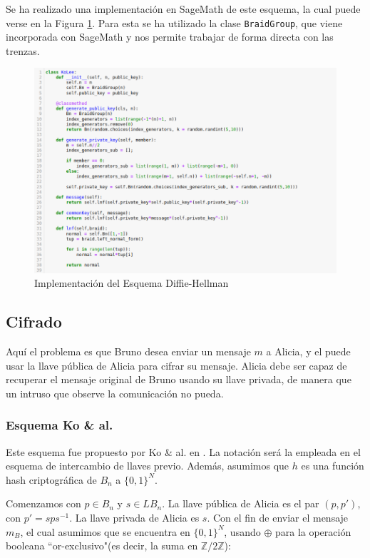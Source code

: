\documentclass[12pt]{book}
\theoremstyle{definition}
\begin{document}
Se ha realizado una implementación en SageMath de este esquema, la cual puede verse en la Figura \ref{img:imp_ko}. Para esta se ha utilizado la clase \texttt{BraidGroup}, que viene incorporada con SageMath y nos permite trabajar de forma directa con las trenzas.
\begin{figure}
\includegraphics[scale=0.5]{imgs/KoLee.png}
\caption{Implementación del Esquema Diffie-Hellman}
\label{img:imp_ko}
\end{figure}

\subsection{Cifrado}
Aquí el problema es que Bruno desea enviar un mensaje $m$ a Alicia, y el puede usar la llave pública de Alicia para cifrar su mensaje. Alicia debe ser capaz de recuperar el mensaje original de Bruno usando su llave privada, de manera que un intruso que observe la comunicación no pueda.

\subsubsection*{Esquema Ko \& al.}
Este esquema fue propuesto por Ko \& al. en \cite{Ko}. La notación será la empleada en el esquema de intercambio de llaves previo. Además, asumimos que $h$ es una función hash criptográfica de $B_n$ a $\{0,1\}^N$.

Comenzamos con $p\in B_n$ y $s\in LB_n$. La llave pública de Alicia es el par $(p,p')$, con $p'=sps^{-1}$. La llave privada de Alicia es $s$. Con el fin de enviar el mensaje $m_B$, el cual asumimos que se encuentra en $\{0,1\}^N$, usando $\oplus$ para la operación booleana ``or-exclusivo"(es decir, la suma en $\mathbb{Z}/2\mathbb{Z}$):
\end{document}
